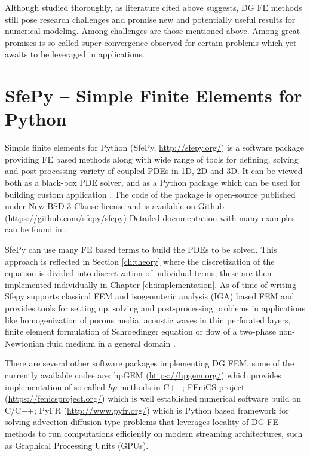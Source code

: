 Although studied thoroughly, as literature cited above suggests, DG FE 
methods still pose research challenges and promise new and potentially useful results for 
numerical modeling. Among challenges are those mentioned above. Among great promises is 
so called super-convergence observed for certain problems \cite{Roe2017} which yet awaits 
to be leveraged in applications.


\section{SfePy -- Simple Finite Elements for Python}

Simple finite elements for Python (SfePy, 
\url{http://sfepy.org/}) is a software 
package providing FE based methods along with wide range of tools for defining, solving 
and post-processing variety of coupled PDEs in 1D, 2D and 3D. It can be viewed both as a 
black-box PDE solver, and as a Python package which can be used for building custom 
application \cite{Cimrman_Lukes_Rohan_2019}. The code of the package is open-source 
published under New BSD-3 Clause license \cite{bsd3-lic} and is available on Github 
(\url{https://github.com/sfepy/sfepy}) %
Detailed documentation with many examples can be found in 
\cite{sfepy-doc}.

SfePy can use many FE based terms to 
build the PDEs to be solved. This approach is reflected in Section \ref{ch:theory}
where the discretization of the equation is divided into discretization of individual 
terms, these are then implemented individually in Chapter \ref{ch:implementation}. As of 
time of writing Sfepy supports classical FEM and isogeomteric analysis (IGA) based FEM 
and 
provides tools for setting up, solving and post-processing problems in applications like 
homogenization of porous media, acoustic waves in thin perforated layers,  finite element 
formulation of Schroedinger equation or flow of a two-phase non-Newtonian fluid medium in 
a general domain \cite{Cimrman_Lukes_Rohan_2019}.

There are several other software packages implementing  DG FEM, some of the currently 
available codes are:
hpGEM \cite{hpgem2007} (\url{https://hpgem.org/}) which provides implementation of 
so-called $hp$-methods in C++; 
FEniCS project \cite{fenics2015} (\url{https://fenicsproject.org/}) which is well 
established numerical software build on C/C++;
PyFR \cite{pyfr2014} (\url{http://www.pyfr.org/}) which is  Python based framework for 
solving advection-diffusion type problems that leverages locality of DG FE methods to run 
computations efficiently on modern streaming architectures, such as Graphical 
Processing Units (GPUs)\cite[p. ]{pyfr2014}.

